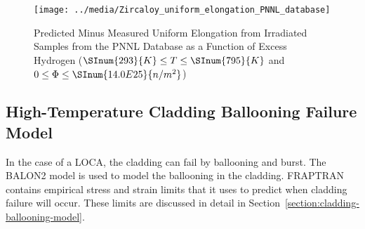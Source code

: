 \begin{figure}
 \texttt{[image: ../media/Zircaloy\_uniform\_elongation\_PNNL\_database]}
 \caption{Predicted Minus Measured Uniform Elongation from Irradiated Samples from the PNNL Database
    as a Function of Excess Hydrogen (\(\SInum{293}{K} \leq T \leq \SInum{795}{K}\) and \(0 \leq \Phi \leq \SInum{14.0E25}{n/m^{2}}\))}
    \label{fig:predicted_minus_measured_uniform_elongation_Zirc}
\end{figure}

\subsection{High-Temperature Cladding Ballooning Failure Model}\label{section:high-temperature-cladding-ballooning-failure-model}

In the case of a LOCA, the cladding can fail by ballooning and burst.  The BALON2 model is used to
model the ballooning in the cladding.  FRAPTRAN contains empirical stress and strain limits that it
uses to predict when cladding failure will occur. These limits are discussed in detail in
Section~\ref{section:cladding-ballooning-model}.
